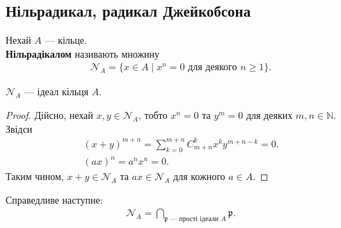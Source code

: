 \documentclass{math_library}
\begin{document}
\subsection{Нільрадикал, радикал Джейкобсона}
\begin{definition}
Нехай $A$ --- кільце. \\
\textbf{Нільрадікалом} називають множину
\begin{align*}
\mathcal{N}_A = \{ x \in A \mid x^n = 0 \text{ для деякого } n \geq 1 \}.
\end{align*}
\end{definition}

\begin{proposition}
$\mathcal{N}_A$ --- ідеал кільця $A$.
\end{proposition}

\begin{proof}
Дійсно, нехай $x,y \in \mathcal{N}_A$, тобто $x^n = 0$ та $y^m = 0$ для деяких $m,n \in \mathbb{N}$. Звідси
\begin{align*}
(x+y)^{m+n} = \sum_{k=0}^{m+n} C_{m+n}^k x^k y^{m+n-k} = 0. \\
(ax)^n = a^n x^n = 0.
\end{align*}
Таким чином, $x+y \in \mathcal{N}_A$ та $ax \in \mathcal{N}_A$ для кожного $a \in A$.
\end{proof}

\begin{theorem}
Справедливе наступне:
\begin{align*}
\mathcal{N}_A = \bigcap_{\mathfrak{p} \text{ --- прості ідеали $A$}} \mathfrak{p}.
\end{align*}
\end{theorem}
\end{document}
